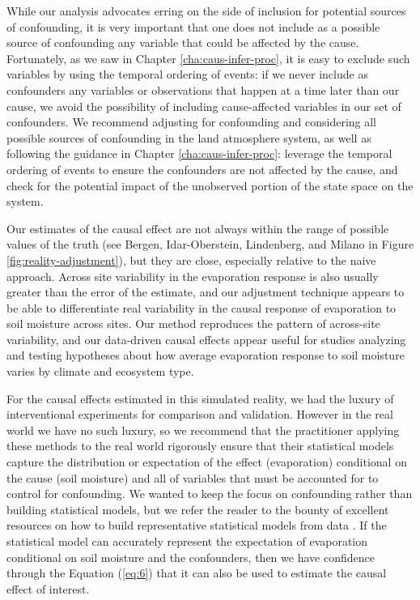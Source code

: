 \documentclass[12pt]{article}
\begin{document}
While our analysis advocates erring on the side of inclusion for
potential sources of confounding, it is very important that one does
not include as a possible source of confounding any variable that
could be affected by the cause. Fortunately, as we saw in Chapter
\ref{cha:caus-infer-proc}, it is easy to exclude such variables by
using the temporal ordering of events: if we never include as
confounders any variables or observations that happen at a time later
than our cause, we avoid the possibility of including cause-affected
variables in our set of confounders. We recommend adjusting for
confounding and considering all possible sources of confounding in the
land atmosphere system, as well as following the guidance in Chapter
\ref{cha:caus-infer-proc}: leverage the temporal ordering of events to
ensure the confounders are not affected by the cause, and check for
the potential impact of the unobserved portion of the state space on
the system.

Our estimates of the causal effect are not always within the range of
possible values of the truth (see Bergen, Idar-Oberstein, Lindenberg,
and Milano in Figure \ref{fig:reality-adjustment}), but they are
close, especially relative to the naive approach. Across site
variability in the evaporation response is also usually greater than
the error of the estimate, and our adjustment technique appears to be
able to differentiate real variability in the causal response of
evaporation to soil moisture across sites. Our method reproduces the
pattern of across-site variability, and our data-driven causal effects
appear useful for studies analyzing and testing hypotheses about how
average evaporation response to soil moisture varies by climate and
ecosystem type.

For the causal effects estimated in this simulated reality, we had the
luxury of interventional experiments for comparison and
validation. However in the real world we have no such luxury, so we
recommend that the practitioner applying these methods to the real
world rigorously ensure that their statistical models capture the
distribution or expectation of the effect (evaporation) conditional on
the cause (soil moisture) and all of variables that must be accounted
for to control for confounding. We wanted to keep the focus on
confounding rather than building statistical models, but we refer the
reader to the bounty of excellent resources on how to build
representative statistical models from data
\cite{shalizi2013,blei2014,gelman1995bayesian}. If the
statistical model can accurately represent the expectation of
evaporation conditional on soil moisture and the confounders, then we
have confidence through the Equation (\ref{eq:6}) that it can also be
used to estimate the causal effect of interest.
\end{document}
